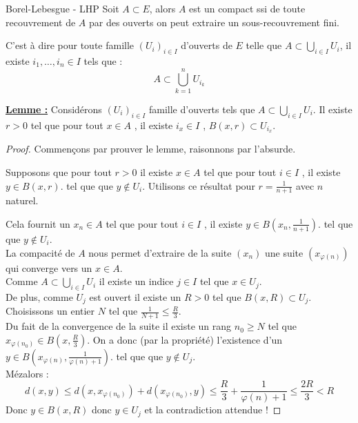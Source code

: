 \begin{definition}{Borel-Lebesgue - LHP}{}
    Soit $A \subset E$, alors
    $A$ est un compact ssi de toute recouvrement de $A$ par des ouverts on peut extraire un sous-recouvrement fini.

    C'est à dire pour toute famille $(U_i)_{i \in I}$ d'ouverts de $E$ 
    telle que $\displaystyle A \subset \bigcup_{i \in I} U_i$, il existe $i_1, \ldots, i_n \in I$ tels que :
    \[A \subset \bigcup_{k=1}^n U_{i_k}\]
\end{definition}

\uline{{\bf Lemme  :}}
Considérons $(U_i)_{i \in I}$ famille d'ouverts tels que $A \subset \bigcup_{i \in I} U_i$.
 Il existe $r>0$ tel que pour tout $x\in A$ , il existe $i_{x} \in I$ , $B(x,r) \subset U_{i_x}$.

\begin{proof}
Commençons par prouver le lemme, raisonnons par l'absurde.

Supposons que pour tout $r>0$ il existe $x\in A$ tel que pour tout $i \in I$ , il existe $y\in B(x,r)$. tel que que $y \notin U_i$.
Utilisons ce résultat pour $r=\frac 1{n+1}$ avec $n$ naturel.

Cela fournit un $x_n \in A$ tel que pour tout $i \in I$ , il existe $y\in B\left(x_n,\frac 1{n+1}\right)$. tel que que $y \notin U_i$. \\

La compacité de $A$ nous permet d'extraire de la suite $(x_n)$ une suite $(x_{\varphi(n)})$ qui converge vers un $x\in A$.\\

Comme $A \subset \bigcup_{i \in I} U_i$ il existe un indice $j \in I$ tel que $x \in U_j$.\\
De plus,  comme $U_j$ est ouvert il existe un $R>0$ tel que $B(x,R) \subset U_j$.\\

Choisissons un entier $N$ tel que $\frac 1{N+1}\leqslant \frac R 3$.\\
Du fait de la convergence de la suite il existe un rang $n_0\geqslant N $ tel que $x_{\varphi(n_0)} \in B\left(x,\frac R 3\right)$.
On a donc (par la propriété) l'existence d'un $y \in B\left(x_{\varphi(n)},\frac 1{\varphi(n)+1}\right)$. tel que que $y \notin U_j$.\\
Mézalors :
\[d(x,y) \leqslant d(x,x_{\varphi(n_0)})+d(x_{\varphi(n_0)},y) \leqslant \frac R 3 + \frac 1{\varphi(n)+1}\leqslant \frac {2R}3 <R\]
Donc $y \in B(x,R)$ donc $y \in U_j$ et la contradiction attendue !
\end{proof}

